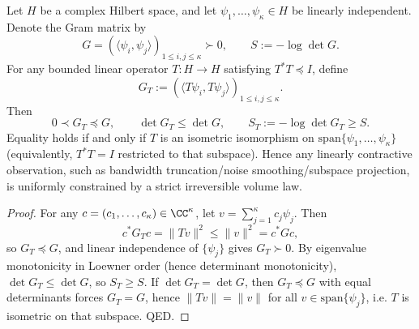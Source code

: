 ﻿%
%

\begin{proposition}\label{prop:xi-gram-det-entropy-monotone-under-contraction}
Let \(H\) be a complex Hilbert space, and let \(\psi_1,\dots,\psi_\kappa\in H\) be linearly independent. Denote the Gram matrix by
\[
G=(\langle\psi_i,\psi_j\rangle)_{1\le i,j\le\kappa}\succ0,
\qquad
S:=-\log\det G.
\]
For any bounded linear operator \(T:H\to H\) satisfying \(T^\ast T\preceq I\), define
\[
G_T:=(\langle T\psi_i,T\psi_j\rangle)_{1\le i,j\le\kappa}.
\]
Then
\[
\boxed{\;
0\prec G_T\preceq G,\qquad
\det G_T\le \det G,\qquad
S_T:=-\log\det G_T\ge S.\;}
\]
Equality holds if and only if \(T\) is an isometric isomorphism on \(\mathrm{span}\{\psi_1,\dots,\psi_\kappa\}\) (equivalently, \(T^\ast T=I\) restricted to that subspace).
Hence any linearly contractive observation, such as bandwidth truncation/noise smoothing/subspace projection, is uniformly constrained by a strict irreversible volume law.
\end{proposition}
\begin{proof}
For any \(c=(c_1,\dots,c_\kappa)\in\CC^\kappa\), let \(v=\sum_{j=1}^\kappa c_j\psi_j\).
Then
\[
c^\ast G_T c=\|Tv\|^2\le \|v\|^2=c^\ast G c,
\]
so \(G_T\preceq G\), and linear independence of \(\{\psi_j\}\) gives \(G_T\succ0\).
By eigenvalue monotonicity in Loewner order (hence determinant monotonicity), \(\det G_T\le \det G\), so \(S_T\ge S\).
If \(\det G_T=\det G\), then \(G_T\preceq G\) with equal determinants forces \(G_T=G\), hence \(\|Tv\|=\|v\|\) for all \(v\in\mathrm{span}\{\psi_j\}\), i.e. \(T\) is isometric on that subspace. QED.
\end{proof}

